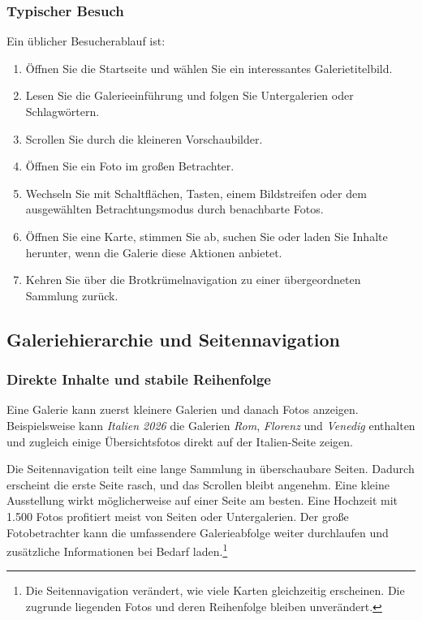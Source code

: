 \documentclass[11pt,a4paper]{article}
\begin{document}
\subsubsection{Typischer Besuch}

Ein üblicher Besucherablauf ist:

\begin{enumerate}
  \item Öffnen Sie die Startseite und wählen Sie ein interessantes
  Galerietitelbild.
  \item Lesen Sie die Galerieeinführung und folgen Sie Untergalerien oder
  Schlagwörtern.
  \item Scrollen Sie durch die kleineren Vorschaubilder.
  \item Öffnen Sie ein Foto im großen Betrachter.
  \item Wechseln Sie mit Schaltflächen, Tasten, einem Bildstreifen oder dem
  ausgewählten Betrachtungsmodus durch benachbarte Fotos.
  \item Öffnen Sie eine Karte, stimmen Sie ab, suchen Sie oder laden Sie Inhalte
  herunter, wenn die Galerie diese Aktionen anbietet.
  \item Kehren Sie über die Brotkrümelnavigation zu einer übergeordneten
  Sammlung zurück.
\end{enumerate}

\subsection{Galeriehierarchie und Seitennavigation}

\subsubsection{Direkte Inhalte und stabile Reihenfolge}

Eine Galerie kann zuerst kleinere Galerien und danach Fotos anzeigen.
Beispielsweise kann \emph{Italien 2026} die Galerien \emph{Rom}, \emph{Florenz}
und \emph{Venedig} enthalten und zugleich einige Übersichtsfotos direkt auf der
Italien-Seite zeigen.

Die Seitennavigation teilt eine lange Sammlung in überschaubare Seiten. Dadurch
erscheint die erste Seite rasch, und das Scrollen bleibt angenehm. Eine kleine
Ausstellung wirkt möglicherweise auf einer Seite am besten. Eine Hochzeit mit
1.500 Fotos profitiert meist von Seiten oder Untergalerien. Der große
Fotobetrachter kann die umfassendere Galerieabfolge weiter durchlaufen und
zusätzliche Informationen bei Bedarf laden.\footnote{Die Seitennavigation
verändert, wie viele Karten gleichzeitig erscheinen. Die zugrunde liegenden
Fotos und deren Reihenfolge bleiben unverändert.}
\end{document}
